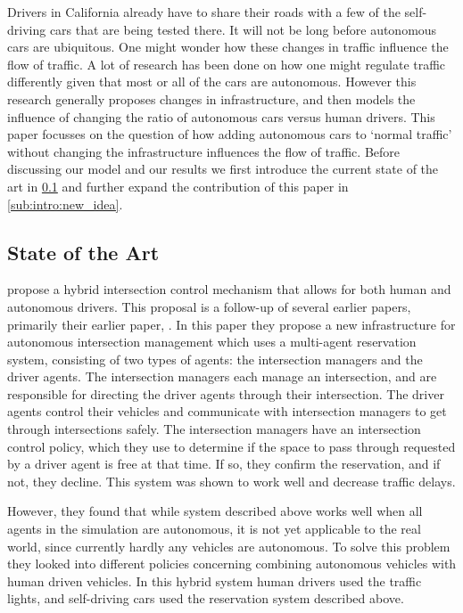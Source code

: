 Drivers in California already have to share their roads with a few of the self-driving cars that are being tested there. It will not be long before autonomous cars are ubiquitous. One might wonder how these changes in traffic influence the flow of traffic. A lot of research has been done on how one might regulate traffic differently given that most or all of the cars are autonomous. However this research generally proposes changes in infrastructure, and then models the influence of changing the ratio of autonomous cars versus human drivers. This paper focusses on the question of how adding autonomous cars to `normal traffic' without changing the infrastructure influences the flow of traffic. Before discussing our model and our results we first introduce the current state of the art in \cref{sub:intro:state_of_the_art} and further expand the contribution of this paper in \cref{sub:intro:new_idea}.

\subsection{State of the Art}
\label{sub:intro:state_of_the_art}
\textcite{dresner2007sharing} propose a hybrid intersection control mechanism that allows for both human and autonomous drivers. This proposal is a follow-up of several earlier papers, primarily their earlier paper, \cite{dresner2005traffic}. In this paper they propose a new infrastructure for autonomous intersection management which uses a multi-agent reservation system, consisting of two types of agents: the intersection managers and the driver agents. The intersection managers each manage an intersection, and are responsible for directing the driver agents through their intersection. The driver agents control their vehicles and communicate with intersection managers to get through intersections safely. The intersection managers have an intersection control policy, which they use to determine if the space to pass through requested by a driver agent is free at that time. If so, they confirm the reservation, and if not, they decline. This system was shown to work well and decrease traffic delays. 

However, they found that while system described above works well when all agents in the simulation are autonomous, it is not yet applicable to the real world, since currently hardly any vehicles are autonomous. To solve this problem they looked into different policies concerning combining autonomous vehicles with human driven vehicles. In this hybrid system human drivers used the traffic lights, and self-driving cars used the reservation system described above.

